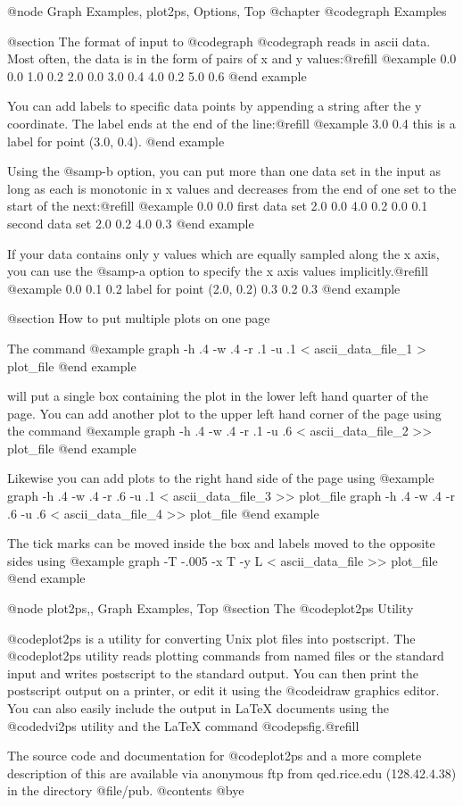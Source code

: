 @node Graph Examples, plot2ps, Options, Top
@chapter @code{graph} Examples

@section The format of input to @code{graph}
@code{graph} reads in ascii data.  Most often, the data is in the form
of pairs of x and y values:@refill
@example
0.0  0.0
1.0  0.2
2.0  0.0
3.0  0.4
4.0  0.2
5.0  0.6
@end example

You can add labels to specific data points by appending a string after
the  y coordinate.  The label ends at the end of the line:@refill
@example
3.0  0.4 this is a label for point (3.0, 0.4).
@end example

Using the @samp{-b} option, you can put more than one data set in the
input as long as each is monotonic in x values and decreases from the
end of one set to the start of the next:@refill
@example
0.0  0.0 first data set
2.0  0.0
4.0  0.2
0.0  0.1 second data set
2.0  0.2
4.0  0.3
@end example

If your data contains only y values which are equally sampled along the x
axis, you can use the @samp{-a} option to specify the x axis values
implicitly.@refill
@example
0.0
0.1
0.2 label for point (2.0, 0.2)
0.3
0.2
0.3
@end example

@section How to put multiple plots on one page

The command
@example
graph -h .4 -w .4 -r .1 -u .1 < ascii_data_file_1 >  plot_file
@end example

will put a single box containing the plot in the lower left hand
quarter of the page.  You can add another plot to the upper left hand
corner of the page using the command
@example
graph -h .4 -w .4 -r .1 -u .6 < ascii_data_file_2 >> plot_file
@end example

Likewise you can add plots to the right hand side of the page using
@example
graph -h .4 -w .4 -r .6 -u .1 < ascii_data_file_3 >> plot_file
graph -h .4 -w .4 -r .6 -u .6 < ascii_data_file_4 >> plot_file
@end example

The tick marks can be moved inside the box and labels moved to the
opposite sides using
@example
graph -T -.005 -x T -y L < ascii_data_file >> plot_file
@end example

@node plot2ps,, Graph Examples, Top
@section The @code{plot2ps} Utility

@code{plot2ps} is a utility for converting Unix plot files into
postscript.  The @code{plot2ps} utility reads plotting commands from
named files or the standard input and writes postscript to the standard
output.  You can then print the postscript output on a printer, or edit
it using the @code{idraw} graphics editor.  You can also easily include
the output in LaTeX documents using the @code{dvi2ps} utility and the
LaTeX command @code{psfig}.@refill

The source code and documentation for @code{plot2ps} and a more complete
description of this are available via anonymous ftp from qed.rice.edu
(128.42.4.38) in the directory @file{/pub}.
@contents
@bye
